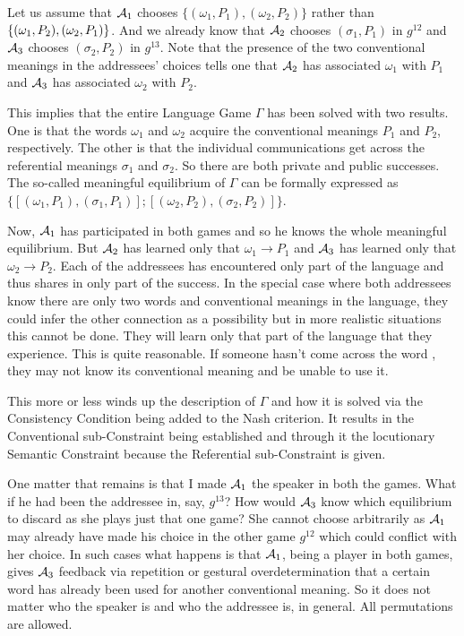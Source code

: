 Let us assume that ${\cal A}_1$ chooses $\{(\omega_1,P_1), (\omega_2,P_2)\}$ rather than $\{(\omega_1,P_2),\linebreak (\omega_2,P_1)\}$. And we already know that ${\cal A}_2$ chooses $(\sigma_1,P_1)$ in $g^{12}$ and ${\cal A}_3$ chooses $(\sigma_2,P_2)$ in $g^{13}$. Note that the presence of the two conventional meanings in the addressees' choices tells one that ${\cal A}_2$ has associated $\omega_1$ with $P_1$ and ${\cal A}_3$ has associated $\omega_2$ with $P_2$.

This implies that the entire Language Game $\Gamma$ has been solved with two results. One is that the words $\omega_1$ and $\omega_2$ acquire the conventional meanings $P_1$ and $P_2$, respectively. The other is that the individual communications get across the referential meanings $\sigma_1$ and $\sigma_2$. So there are both private and public successes. The so-called meaningful equilibrium of $\Gamma$ can be formally expressed as $\{[(\omega_1,P_1), (\sigma_1,P_1)]; [(\omega_2,P_2), (\sigma_2,P_2)]\}$.

Now, ${\cal A}_1$ has participated in both games and so he knows the whole meaningful equilibrium. But ${\cal A}_2$ has learned only that $\omega_1 \longrightarrow P_1$ and ${\cal A}_3$ has learned only that $\omega_2 \longrightarrow P_2$. Each of the addressees has encountered only part of the language and thus shares in only part of the success. In the special case where both addressees know there are only two words and conventional meanings in the language, they could infer the other connection as a possibility but in more realistic situations this cannot be done. They will learn only that part of the language that they experience. This is quite reasonable. If someone hasn't come across the word , they may not know its conventional meaning and be unable to use it.

This more or less winds up the description of $\Gamma$ and how it is solved via the Consistency Condition being added to the Nash criterion. It results in the Conventional sub-Constraint being established and through it the locutionary Semantic Constraint because the Referential sub-Constraint is given.

One matter that remains is that I made ${\cal A}_1$ the speaker in both the games. What if he had been the addressee in, say, $g^{13}$? How would ${\cal A}_3$ know which equilibrium to discard as she plays just that one game? She cannot choose arbitrarily as ${\cal A}_1$ may already have made his choice in the other game $g^{12}$ which could conflict with her choice. In such cases what happens is that ${\cal A}_1$, being a player in both games, gives ${\cal A}_3$ feedback via repetition or gestural overdetermination that a certain word has already been used for another conventional meaning. So it does not matter who the speaker is and who the addressee is, in general. All permutations are allowed.

